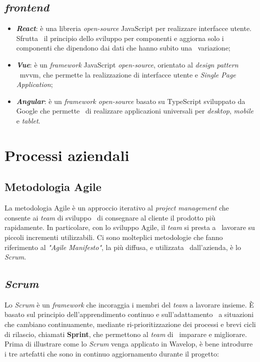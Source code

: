 \subsection{\emph{\Gls{frontend}}}

\begin{itemize}
  \item \textbf{\emph{React}}: è una libreria \emph{\gls{open-source}} JavaScript per realizzare interfacce utente. Sfrutta \
  il principio dello sviluppo per componenti e aggiorna solo i componenti che dipendono dai dati che hanno subito una \
  variazione;
  \item \textbf{\emph{Vue}}: è un \emph{framework} JavaScript \emph{open-source}, orientato al \emph{design pattern} \
  \acrshort{mvvm}, che permette la realizzazione di interfacce utente e \emph{Single Page Application};
  \item \textbf{\emph{Angular}}: è un \emph{framework open-source} basato su TypeScript sviluppato da Google che permette \
  di realizzare applicazioni universali per \emph{desktop}, \emph{mobile} e \emph{tablet}.
\end{itemize}

\section{Processi aziendali}

\subsection{Metodologia Agile}
La metodologia Agile è un approccio iterativo al \emph{project management} che consente ai \emph{team} di sviluppo \
di consegnare al cliente il prodotto più rapidamente. In particolare, con lo sviluppo Agile, il \emph{team} si presta a \
lavorare su piccoli incrementi utilizzabili. Ci sono molteplici metodologie che fanno riferimento al \emph{"Agile Manifesto"}, la più diffusa, e utilizzata \
dall'azienda, è lo \emph{Scrum}.

\subsection{\emph{Scrum}}
Lo \emph{Scrum} è un \emph{framework} che incoraggia i membri del \emph{team} a lavorare insieme. È basato sul principio dell'apprendimento continuo e sull'adattamento \
a situazioni che cambiano continuamente, mediante ri-prioritizzazione dei processi e brevi cicli di rilascio, chiamati \textbf{Sprint}, che permettono al \emph{team} di \
imparare e migliorare. Prima di illustrare come lo \emph{Scrum} venga applicato in Wavelop, è bene introdurre i tre artefatti che sono in continuo aggiornamento durante il progetto:

